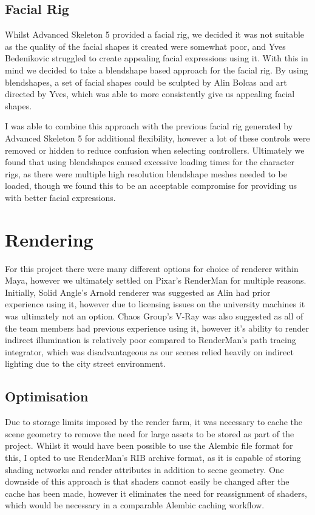 \documentclass[11pt]{article}
\begin{document}
\subsection{Facial Rig}

Whilst Advanced Skeleton 5 provided a facial rig, we decided it was not suitable as the quality of the facial shapes it created were somewhat poor, and Yves Bedenikovic struggled to create appealing facial expressions using it. With this in mind we decided to take a blendshape based approach for the facial rig. By using blendshapes, a set of facial shapes could be sculpted by Alin Bolcas and art directed by Yves, which was able to more consistently give us appealing facial shapes.

I was able to combine this approach with the previous facial rig generated by Advanced Skeleton 5 for additional flexibility, however a lot of these controls were removed or hidden to reduce confusion when selecting controllers. Ultimately we found that using blendshapes caused excessive loading times for the character rigs, as there were multiple high resolution blendshape meshes needed to be loaded, though we found this to be an acceptable compromise for providing us with better facial expressions.

\newpage

\section{Rendering}

For this project there were many different options for choice of renderer within Maya, however we ultimately settled on Pixar's RenderMan for multiple reasons. Initially, Solid Angle's Arnold renderer was suggested as Alin had prior experience using it, however due to licensing issues on the university machines it was ultimately not an option. Chaos Group's V-Ray was also suggested as all of the team members had previous experience using it, however it's ability to render indirect illumination is relatively poor compared to RenderMan's path tracing integrator, which was disadvantageous as our scenes relied heavily on indirect lighting due to the city street environment.

\subsection{Optimisation} \label{rlslgt}

Due to storage limits imposed by the render farm, it was necessary to cache the scene geometry to remove the need for large assets to be stored as part of the project. Whilst it would have been possible to use the Alembic file format for this, I opted to use RenderMan's RIB archive format, as it is capable of storing shading networks and render attributes in addition to scene geometry. One downside of this approach is that shaders cannot easily be changed after the cache has been made, however it eliminates the need for reassignment of shaders, which would be necessary in a comparable Alembic caching workflow.
\end{document}
